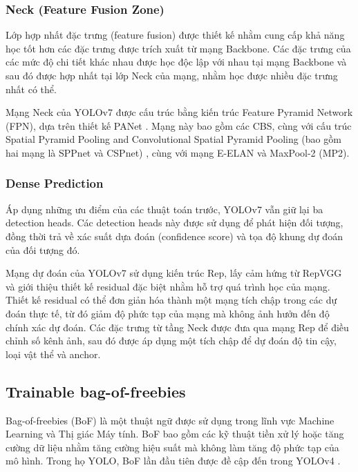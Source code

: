 \subsubsection*{Neck (Feature Fusion Zone)} 
Lớp hợp nhất đặc trưng (feature fusion) được thiết kế nhằm cung cấp khả năng học tốt hơn các đặc trưng được trích xuất từ mạng Backbone. Các đặc trưng của các mức độ chi tiết khác nhau được học độc lập với nhau tại mạng Backbone và sau đó được hợp nhất tại lớp Neck của mạng, nhằm học được nhiều đặc trưng nhất có thể.

Mạng Neck của YOLOv7 được cấu trúc bằng kiến trúc Feature Pyramid Network (FPN)\cite{lin2017feature}, dựa trên thiết kế PANet \cite{Liu2018}. Mạng này bao gồm các CBS, cùng với cấu trúc Spatial Pyramid Pooling and Convolutional Spatial Pyramid Pooling (bao gồm hai mạng là SPPnet và CSPnet) \cite{he2015spatial, wang2020cspnet}, cùng với mạng E-ELAN và MaxPool-2 (MP2).  

\subsubsection*{Dense Prediction}
Áp dụng những ưu điểm của các thuật toán trước, YOLOv7 vẫn giữ lại ba detection heads. Các detection heads này được sử dụng để phát hiện đối tượng, đồng thời trả về xác suất dựa đoán (confidence score) và tọa độ khung dự đoán của đối tượng đó.

Mạng dự đoán của YOLOv7 sử dụng kiến trúc Rep, lấy cảm hứng từ RepVGG \cite{ding2021repvgg} và giới thiệu thiết kế residual đặc biệt nhằm hỗ trợ quá trình học của mạng. Thiết kế residual có thể đơn giản hóa thành một mạng tích chập trong các dự đoán thực tế, từ đó giảm độ phức tạp của mạng mà không ảnh hưởn đến độ chính xác dự đoán. Các đặc trưng từ tầng Neck được đưa qua mạng Rep để điều chỉnh số kênh ảnh, sau đó được áp dụng một tích chập để dự đoán độ tin cậy, loại vật thể và anchor.


\subsection{Trainable bag-of-freebies}
Bag-of-freebies (BoF) là một thuật ngữ được sử dụng trong lĩnh vực Machine Learning và Thị giác Máy tính. BoF bao gồm các kỹ thuật tiền xử lý hoặc tăng cường dữ liệu nhằm tăng cường hiệu suất mà không làm tăng độ phức tạp của mô hình. Trong họ YOLO, BoF lần đầu tiên được đề cập đến trong YOLOv4 \cite{bochkovskiy2020yolov4}. 
